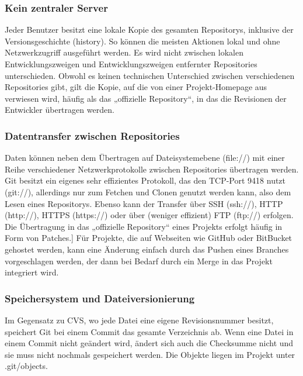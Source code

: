 \subsubsection{Kein zentraler Server}
Jeder Benutzer besitzt eine lokale Kopie des gesamten Repositorys, inklusive der Versionsgeschichte (history). So können die meisten Aktionen lokal und ohne Netzwerkzugriff ausgeführt werden. Es wird nicht zwischen lokalen Entwicklungszweigen und Entwicklungszweigen entfernter Repositories unterschieden. Obwohl es keinen technischen Unterschied zwischen verschiedenen Repositories gibt, gilt die Kopie, auf die von einer Projekt-Homepage aus verwiesen wird, häufig als das „offizielle Repository“, in das die Revisionen der Entwickler übertragen werden.
\subsubsection{Datentransfer zwischen Repositories}
Daten können neben dem Übertragen auf Dateisystemebene (file://) mit einer Reihe verschiedener Netzwerkprotokolle zwischen Repositories übertragen werden. Git besitzt ein eigenes sehr effizientes Protokoll, das den TCP-Port 9418 nutzt (git://), allerdings nur zum Fetchen und Clonen genutzt werden kann, also dem Lesen eines Repositorys. Ebenso kann der Transfer über SSH (ssh://), HTTP (http://), HTTPS (https://) oder über (weniger effizient) FTP
(ftp://) erfolgen. Die Übertragung in das „offizielle Repository“ eines Projekts erfolgt häufig in Form von Patches.] Für Projekte, die auf Webseiten wie GitHub oder BitBucket gehostet werden, kann eine Änderung einfach durch das Pushen eines Branches vorgeschlagen werden, der dann bei Bedarf durch ein Merge in das Projekt integriert wird.
\subsubsection{Speichersystem und Dateiversionierung}
Im Gegensatz zu CVS, wo jede Datei eine eigene Revisionsnummer besitzt, speichert Git bei einem Commit das gesamte Verzeichnis ab. Wenn eine Datei in einem Commit nicht geändert wird, ändert sich auch die Checksumme nicht und sie muss nicht nochmals gespeichert werden. Die Objekte liegen im Projekt unter .git/objects.
